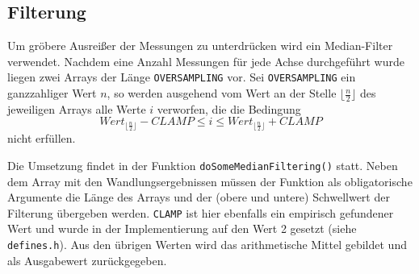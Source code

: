 		\subsection{Filterung}
			Um gröbere Ausreißer der Messungen zu unterdrücken wird ein Median-Filter verwendet.
			Nachdem eine Anzahl Messungen für jede Achse durchgeführt wurde liegen zwei Arrays der Länge \texttt{OVERSAMPLING} vor.
			Sei \texttt{OVERSAMPLING} ein ganzzahliger Wert \(n\), so werden ausgehend vom Wert an der Stelle \(\lfloor \frac{n}{2}\rfloor\) des jeweiligen Arrays alle Werte \(i\) verworfen, die die Bedingung
			\begin{equation}
				Wert_{\lfloor \frac{n}{2}\rfloor} - CLAMP \leq i \leq Wert_{\lfloor \frac{n}{2}\rfloor} + CLAMP
			\end{equation}
			nicht erfüllen.\par
			Die Umsetzung findet in der Funktion \texttt{doSomeMedianFiltering()} statt.
			Neben dem Array mit den Wandlungsergebnissen müssen der Funktion als obligatorische Argumente die Länge des Arrays und der (obere und untere) Schwellwert der Filterung übergeben werden.
			\texttt{CLAMP} ist hier ebenfalls ein empirisch gefundener Wert und wurde in der Implementierung auf den Wert 2 gesetzt (siehe \texttt{defines.h}).
			Aus den übrigen Werten wird das arithmetische Mittel gebildet und als Ausgabewert zurückgegeben.
